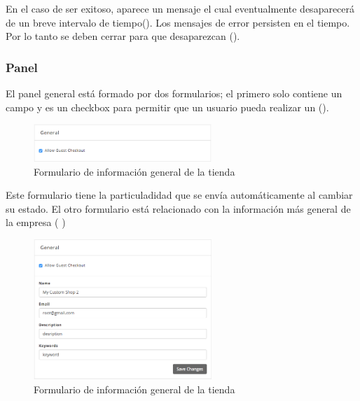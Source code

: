 En el caso de ser exitoso, aparece un mensaje el cual eventualmente desaparecerá de un breve intervalo de tiempo(). Los mensajes de error persisten en el tiempo. Por lo tanto se deben cerrar para que desaparezcan ().


\subsubsection*{Panel \generalPanel}

El panel general está formado por dos formularios; el primero solo contiene un campo y es un checkbox para permitir que un usuario \userGuestAccount pueda realizar un \checkoutCOM ().

\begin{figure}[H]
	\centering
	\includegraphics[width=0.6\textwidth]{figuras/dashboard/ecommerce/general_menu/allow_checkout.png}
	\caption{Formulario de información general de la tienda}
	\label{figure:dashboard:ecommerce:general_menu:allow_checkout}
\end{figure}

Este formulario tiene la particuladidad que se envía automáticamente al cambiar su estado.
El otro formulario está relacionado con la información más general de la empresa ( )

\begin{figure}[H]
	\centering
	\includegraphics[width=0.6\textwidth]{figuras/dashboard/ecommerce/general_menu/menu.png}
	\caption{Formulario de información general de la tienda}
	\label{figure:dashboard:ecommerce:general_menu:menu}
\end{figure}

